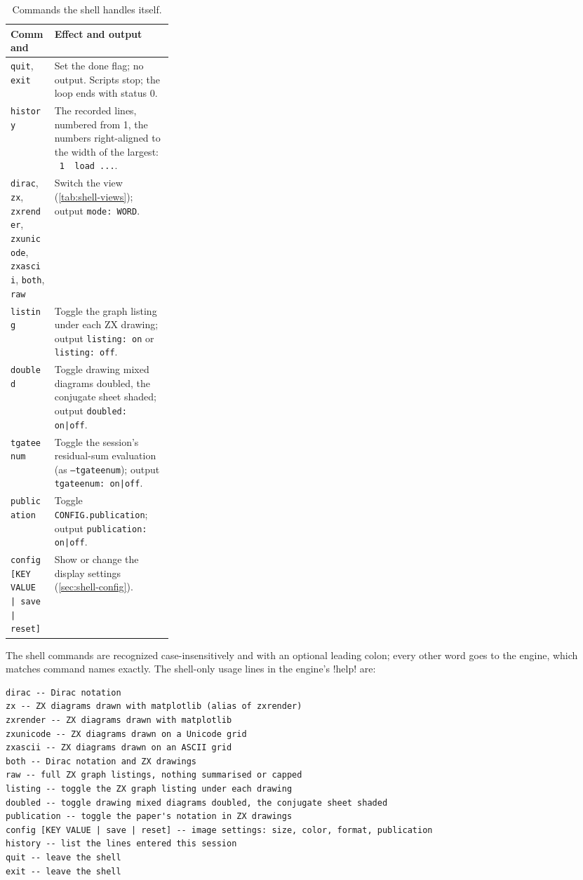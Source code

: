 \begin{table}[H]
\centering\small
\begin{tabularx}{\linewidth}{@{}>{\raggedright\arraybackslash}p{0.27\linewidth}X@{}}
\toprule
Command & Effect and output \\
\midrule
\texttt{quit}, \texttt{exit} & Set the done flag; no output. Scripts stop; the loop ends with status 0. \\
\texttt{history} & The recorded lines, numbered from 1, the numbers right-aligned to the width of the largest: \texttt{\ 1\ \ load ...}. \\
\texttt{dirac}, \texttt{zx}, \texttt{zxrender}, \texttt{zxunicode}, \texttt{zxascii}, \texttt{both}, \texttt{raw} & Switch the view (\cref{tab:shell-views}); output \texttt{mode: WORD}. \\
\texttt{listing} & Toggle the graph listing under each ZX drawing; output \texttt{listing: on} or \texttt{listing: off}. \\
\texttt{doubled} & Toggle drawing mixed diagrams doubled, the conjugate sheet shaded; output \texttt{doubled: on|off}. \\
\texttt{tgateenum} & Toggle the session's residual-sum evaluation (as \texttt{--tgateenum}); output \texttt{tgateenum: on|off}. \\
\texttt{publication} & Toggle \texttt{CONFIG.publication}; output \texttt{publication: on|off}. \\
\texttt{config [KEY VALUE | save | reset]} & Show or change the display settings (\cref{sec:shell-config}). \\
\bottomrule
\end{tabularx}
\caption{Commands the shell handles itself.}
\label{tab:shell-commands}
\end{table}

The shell commands are recognized case-insensitively and with an optional leading colon; every other word goes to the engine, which matches command names exactly. The shell-only usage lines in the engine's \azx!help! are:
\begin{lstlisting}[style=grammar]
dirac -- Dirac notation
zx -- ZX diagrams drawn with matplotlib (alias of zxrender)
zxrender -- ZX diagrams drawn with matplotlib
zxunicode -- ZX diagrams drawn on a Unicode grid
zxascii -- ZX diagrams drawn on an ASCII grid
both -- Dirac notation and ZX drawings
raw -- full ZX graph listings, nothing summarised or capped
listing -- toggle the ZX graph listing under each drawing
doubled -- toggle drawing mixed diagrams doubled, the conjugate sheet shaded
publication -- toggle the paper's notation in ZX drawings
config [KEY VALUE | save | reset] -- image settings: size, color, format, publication
history -- list the lines entered this session
quit -- leave the shell
exit -- leave the shell
\end{lstlisting}

